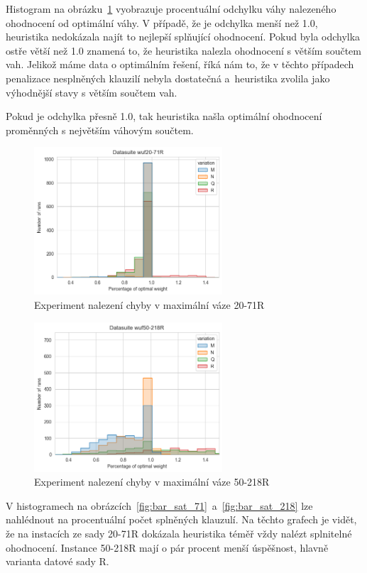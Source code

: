 \documentclass[twoside,twocolumn]{article}
\begin{document}
    Histogram na obrázku~\ref{fig:bar_weight_71} vyobrazuje procentuální odchylku váhy nalezeného ohodnocení
    od optimální váhy.
    V případě, že je odchylka menší než 1.0, heuristika nedokázala najít to nejlepší splňující ohodnocení.
    Pokud byla odchylka ostře větší než 1.0 znamená to, že heuristika nalezla ohodnocení s větším součtem vah.
    Jelikož máme data o optimálním řešení, říká nám to, že v těchto případech penalizace nesplněných klauzilí nebyla dostatečná
    a~heuristika zvolila jako výhodnější stavy s větším součtem vah.

    Pokud je odchylka přesně 1.0, tak heuristika našla optimální ohodnocení proměnných s největším váhovým součtem.

    \begin{figure}
        \centering
        \includegraphics[width=7cm]{images/testing/bar/weight/wuf20-71R}
        \caption{Experiment nalezení chyby v maximální váze 20-71R}
        \label{fig:bar_weight_71}
    \end{figure}

    \begin{figure}
        \centering
        \includegraphics[width=7cm]{images/testing/bar/weight/wuf50-218R}
        \caption{Experiment nalezení chyby v maximální váze 50-218R}
        \label{fig:bar_weight_218}
    \end{figure}

    V histogramech na obrázcích~\ref{fig:bar_sat_71}~a~\ref{fig:bar_sat_218} lze nahlédnout na procentuální počet splněných klauzulí.
    Na těchto grafech je vidět, že na instacích ze sady 20-71R dokázala heuristika téměř vždy nalézt splnitelné ohodnocení.
    Instance 50-218R mají o pár procent menší úspěšnost, hlavně varianta datové sady R.
\end{document}
